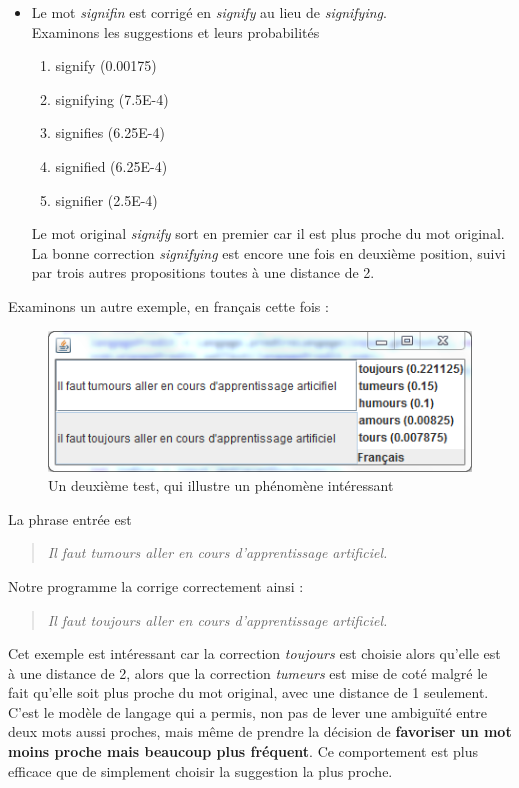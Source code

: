 \documentclass[10pt,a4paper]{article}
\begin{document}
\begin{itemize}
\item Le mot \textit{signifin} est corrigé en \textit{signify} au lieu de \textit{signifying}.\\
Examinons les suggestions et leurs probabilités
\begin{enumerate}
\item signify (0.00175)
\item signifying (7.5E-4)
\item signifies (6.25E-4)
\item signified (6.25E-4)
\item signifier (2.5E-4)
\end{enumerate}
Le mot original \textit{signify} sort en premier car il est plus proche du mot original. La bonne correction \textit{signifying} est encore une fois en deuxième position, suivi par trois autres propositions toutes à une distance de 2.\\
\end{itemize}

Examinons un autre exemple, en français cette fois : 

\begin{figure}[H]
\begin{centering}
\includegraphics[scale=1.]{toujours}
\par\end{centering}
\caption{Un deuxième test, qui illustre un phénomène intéressant}
\end{figure}

La phrase entrée est

\begin{quote} 
\centering 
\textit{Il faut tumours aller en cours d'apprentissage artificiel.}
\end{quote}

Notre programme la corrige correctement ainsi : 

\begin{quote} 
\centering 
\textit{Il faut toujours aller en cours d'apprentissage artificiel.}
\end{quote}

Cet exemple est intéressant car la correction \textit{toujours} est choisie alors qu'elle est à une distance de 2, alors que la correction \textit{tumeurs} est mise de coté malgré le fait qu'elle soit plus proche du mot original, avec une distance de 1 seulement.
C'est le modèle de langage qui a permis, non pas de lever une ambiguïté entre deux mots aussi proches, mais même de prendre la décision de \textbf{favoriser un mot moins proche mais beaucoup plus fréquent}. Ce comportement est plus efficace que de simplement choisir la suggestion la plus proche.
\end{document}
